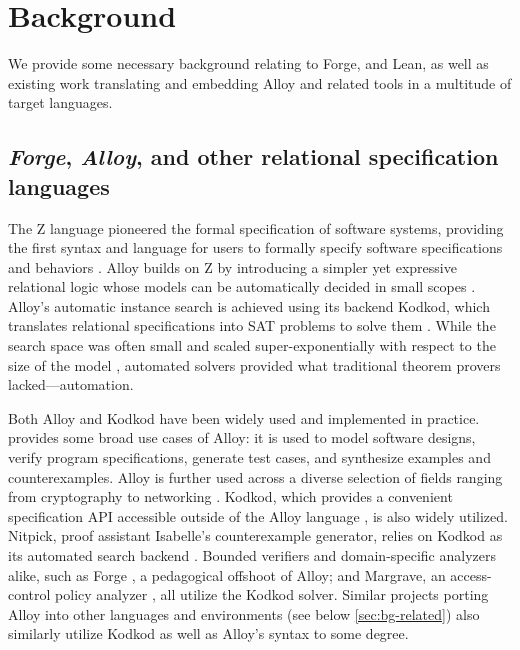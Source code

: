 \section{Background}\label{sec:background}

We provide some necessary background relating to Forge, and Lean, as well as existing work translating and embedding Alloy and related tools in a multitude of target languages. 

\subsection{\emph{Forge}, \emph{Alloy}, and other relational specification languages}\label{sec:bg-forge}

The Z language pioneered the formal specification of software systems, providing the first syntax and language for users to formally specify software specifications and behaviors \cite{spivey1992z}. Alloy builds on Z by introducing a simpler yet expressive relational logic whose models can be automatically decided in small scopes \cite{jackson2019alloy}. Alloy's automatic instance search is achieved using its backend Kodkod, which translates relational specifications into SAT problems to solve them \cite{torlak2007kodkod}. While the search space was often small and scaled super-exponentially with respect to the size of the model \cite{jackson2019alloy}, automated solvers provided what traditional theorem provers lacked---automation. 

Both Alloy and Kodkod have been widely used and implemented in practice. \cite{torlak2013applications} provides some broad use cases of Alloy: it is used to model software designs, verify program specifications, generate test cases, and synthesize examples and counterexamples. Alloy is further used across a diverse selection of fields ranging from cryptography to networking \cite{torlak2013applications}. Kodkod, which provides a convenient specification API accessible outside of the Alloy language \cite{torlak2007kodkod}, is also widely utilized. Nitpick, proof assistant Isabelle's counterexample generator, relies on Kodkod as its automated search backend \cite{blanchette2010nitpick}. Bounded verifiers and domain-specific analyzers alike, such as Forge \cite{ngpdbccdlrrvwwk-oopsla-2024}, a pedagogical offshoot of Alloy; and Margrave, an access-control policy analyzer \cite{nelson2010margrave}, all utilize the Kodkod solver. Similar projects porting Alloy into other languages and environments (see below \cref{sec:bg-related}) also similarly utilize Kodkod as well as Alloy's syntax to some degree. 

